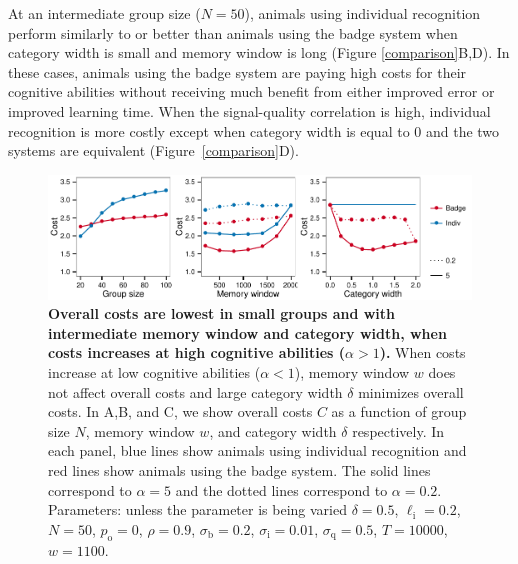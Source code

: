 At an intermediate group size ($N=50$), animals using individual recognition perform similarly to or better than animals using the badge system when category width is small and memory window is long (Figure \ref{comparison}B,D). In these cases, animals using the badge system are paying high costs for their cognitive abilities without receiving much benefit from either improved error or improved learning time. When the signal-quality correlation is high, individual recognition is more costly except when category width is equal to $0$ and the two systems are equivalent (Figure~\ref{comparison}D). 

\begin{figure}
\includegraphics[width=6.85in]{figures/costs.pdf}
\caption{\sffamily\small\textbf{Overall costs are lowest in small groups and with intermediate memory window and category width, when costs increases at high cognitive abilities ($\alpha>1$).} When costs increase at low cognitive abilities ($\alpha<1$), memory window $w$ does not affect overall costs and large category width $\delta$ minimizes overall costs. In A,B, and C, we show overall costs $C$ as a function of group size $N$, memory window $w$, and category width $\delta$ respectively. In each panel, blue lines show animals using individual recognition and red lines show animals using the badge system. The solid lines correspond to $\alpha=5$ and the dotted lines correspond to $\alpha=0.2$.  Parameters: unless the parameter is being varied $\delta = 0.5$, $\ell_\text{i}=0.2$, $N=50$, $p_\text{o}=0$, $\rho=0.9$, $\sigma_\text{b}=0.2$, $\sigma_\text{i}=0.01$, $\sigma_\text{q}=0.5$, $T=10000$, $w=1100$.}
\label{costs}
\end{figure}

